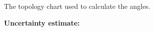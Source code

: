 \documentclass[a4paper,12pt]{article}
\begin{document}
The topology chart used to calculate the angles.

\pagebreak
\textbf{Uncertainty estimate:} \\

\begin{figure}[H]
%
\end{figure}

\pagebreak
\end{document}
